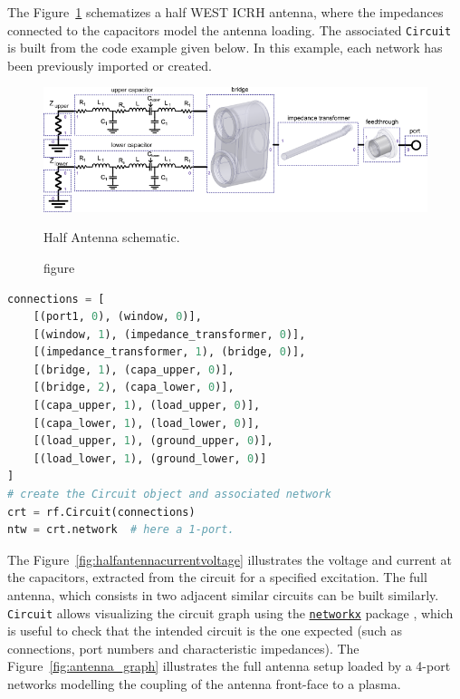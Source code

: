 The Figure~\ref{fig:antenna_circuit} schematizes a half WEST ICRH antenna, where the impedances connected to the capacitors model the antenna loading. The associated \texttt{Circuit} is built from the code example given below. In this example, each network has been previously imported or created. 

\begin{figure}
	\centering
	\includegraphics[width=.95\linewidth]{figures/chap3/WEST_ICRH/antenna_circuit}
	\caption{figure}{Half Antenna schematic.}
	\label{fig:antenna_circuit}
\end{figure}

\begin{lstlisting}[language=Python, basicstyle=\footnotesize]
connections = [
	[(port1, 0), (window, 0)],
	[(window, 1), (impedance_transformer, 0)],
	[(impedance_transformer, 1), (bridge, 0)],
	[(bridge, 1), (capa_upper, 0)],
	[(bridge, 2), (capa_lower, 0)],
	[(capa_upper, 1), (load_upper, 0)],
	[(capa_lower, 1), (load_lower, 0)],
	[(load_upper, 1), (ground_upper, 0)],
	[(load_lower, 1), (ground_lower, 0)]
]
# create the Circuit object and associated network
crt = rf.Circuit(connections) 
ntw = crt.network  # here a 1-port.			
\end{lstlisting}

The Figure~\ref{fig:halfantennacurrentvoltage} illustrates the voltage and current at the capacitors, extracted from the circuit for a specified excitation. The full antenna, which consists in two adjacent similar circuits can be built similarly. \texttt{Circuit} allows visualizing the circuit graph using the \href{https://networkx.github.io/}{\texttt{networkx}} package , which is useful to check that the intended circuit is the one expected (such as connections, port numbers and characteristic impedances). The Figure~\ref{fig:antenna_graph} illustrates the full antenna setup loaded by a 4-port networks modelling the coupling of the antenna front-face to a plasma.

